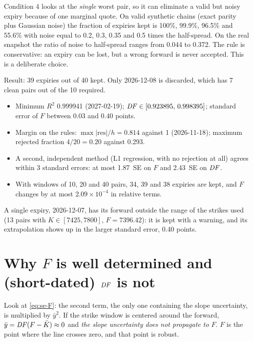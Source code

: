 \begin{attenzione}[title={The price of the ``inside the band'' rule}]
Condition 4 looks at the \emph{single} worst pair, so it can eliminate a valid but noisy expiry because of one
marginal quote. On valid synthetic chains (exact parity plus Gaussian noise) the fraction of expiries kept is 100\%,
99.9\%, 96.5\% and 55.6\% with noise equal to 0.2, 0.3, 0.35 and 0.5 times the half-spread. On the real snapshot the
ratio of noise to half-spread ranges from 0.044 to 0.372. The rule is conservative: an expiry can be lost, but a
wrong forward is never accepted. This is a deliberate choice.
\end{attenzione}

\begin{progetto}
Result: 39 expiries out of 40 kept. Only \mbox{2026-12-08} is discarded, which has 7 clean pairs out of the 10
required.
\begin{itemize}
\item Minimum $R^2$ 0.999941 (\mbox{2027-02-19}); $\mathit{DF}\in[0.923895,\,0.998395]$; standard error of $F$ between 0.03
and 0.40 points.
\item Margin on the rules: $\max|\text{res}|/h=0.814$ against 1 (\mbox{2026-11-18}); maximum rejected fraction
$4/20=0.20$ against 0.293.
\item A second, independent method (L1 regression, with no rejection at all) agrees within 3 standard errors: at
most 1.87~SE on $F$ and 2.43~SE on $\mathit{DF}$.
\item With windows of 10, 20 and 40 pairs, 34, 39 and 38 expiries are kept, and $F$ changes by at most
${2.09\times10^{-4}}$ in relative terms.
\end{itemize}
A single expiry, \mbox{2026-12-07}, has its forward outside the range of the strikes used (13 pairs with
$K\in[7425,7800]$, $F=7396.42$): it is kept with a warning, and its extrapolation shows up in the larger standard
error, 0.40 points.
\end{progetto}

\section{Why \texorpdfstring{$F$}{F} is well determined and (short-dated) \texorpdfstring{$\mathit{DF}$}{DF} is not}
Look at \eqref{eq:se-F}: the second term, the only one containing the slope uncertainty, is multiplied by
$\bar y^2$. If the strike window is centered around the forward, $\bar y=\mathit{DF}(F-\bar K)\approx0$ and \emph{the slope
uncertainty does not propagate to $F$}. $F$ is the point where the line crosses zero, and that point is robust.

